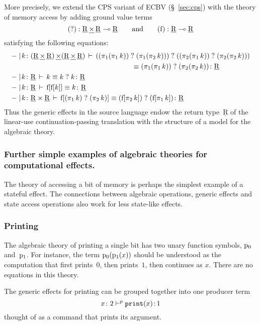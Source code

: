 \documentclass{LMCS}
\newcommand{\pj}[3]{#1 \mathrel{\vdash^p} #2 \colon \! #3}
\newcommand{\EECret}{\comptype{\mathrm{R}}}
\newcommand{\comptype}[1]{\underline{#1}}
\newcommand{\rIn}[2]{#1 \colon  #2}
\newcommand{\aeq}[5]{#1 \mid  \! #2 \, \vdash \, \rIn{#3\equiv #4}{#5}}
\begin{document}
More precisely, we extend the CPS variant of ECBV (\S~\ref{sec:cps}) with 
the theory of memory access
by adding ground value terms
\[
\oreadname:\EECret\mathop{\underline \times}\EECret \lpop \EECret
\qquad\text{and}\qquad
\oflipname:\EECret \lpop \EECret
\]
satisfying the following equations:
\begin{align*}
&
\aeq {-}{k\colon (\EECret\mathop{\underline\times} \EECret) \mathop{\underline\times}(\EECret\mathop{\underline\times}\EECret)}
{\oread 
{(\oread {(\pi_1(\pi_1\,k))}{(\pi_1(\pi_2\,k))})}
{(\oread {(\pi_2(\pi_1\,k))}{(\pi_2(\pi_2\,k))})}\\
&\hspace{6cm}}
{\oread 
{(\pi_1(\pi_1\,k))}{(\pi_2(\pi_2\,k))}}
{\EECret}
\\
&
\aeq {-}{k\colon \EECret}
k{\oread kk}\EECret
\\
&
\aeq {-}{k\colon \EECret}
{\cpsflip{\cpsflip k}}k\EECret
\\
&
\aeq {-}{k\colon \EECret\times \EECret}
{\cpsflip{\oread {(\pi_1\,k)}{(\pi_2\,k)}}}
{\oread {(\cpsflip{\pi_2\,k})}{(\cpsflip{\pi_1\,k})}}
\EECret\end{align*}
Thus
the generic effects in the source language 
endow the return type~$\EECret$ 
of the linear-use continuation-passing translation 
with the structure of a model for the algebraic 
theory.

\subsubsection{Further simple examples of algebraic theories for computational effects.}
\label{sec:furtherexamplesalgtheories}

The theory of accessing a bit of memory is perhaps the simplest example 
of a stateful effect.
The connections between algebraic operations, generic effects and state access operations
also work for less state-like effects.

\subsubsection*{Printing}
The algebraic theory of printing a single bit has 
two unary function symbols, $\mathrm{p}_{0}$ and~$\mathrm{p}_{1}$. 
For instance, the term $\mathrm{p}_{0}(\mathrm{p}_{1}(x))$ 
should be understood as the computation that first prints~$0$, then prints~$1$, then continues as $x$.
There are no equations in this theory.

The generic effects for printing can be grouped together into one
producer term
\[{\pj{x\colon 2}{\eprint{(x)}}1}\]
thought of as a command that prints its argument.
\end{document}
